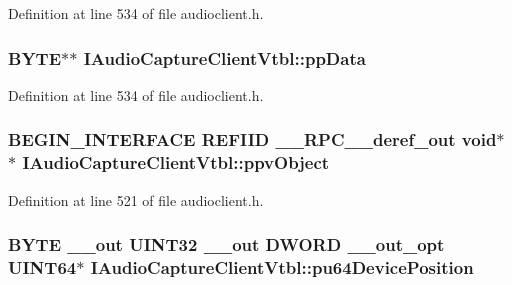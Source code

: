 Definition at line 534 of file audioclient.\+h.

\subsubsection[{\texorpdfstring{pp\+Data}{ppData}}]{ {\bf B\+Y\+TE}$\ast$$\ast$ I\+Audio\+Capture\+Client\+Vtbl\+::pp\+Data}\hypertarget{struct_i_audio_capture_client_vtbl_a98282ba19bf589f5d2b00595a2006ecc}{}\label{struct_i_audio_capture_client_vtbl_a98282ba19bf589f5d2b00595a2006ecc}


Definition at line 534 of file audioclient.\+h.

\subsubsection[{\texorpdfstring{ppv\+Object}{ppvObject}}]{\setlength{\rightskip}{0pt plus 5cm}B\+E\+G\+I\+N\+\_\+\+I\+N\+T\+E\+R\+F\+A\+CE {\bf R\+E\+F\+I\+ID} {\bf \+\_\+\+\_\+\+R\+P\+C\+\_\+\+\_\+deref\+\_\+out} {\bf void}$\ast$$\ast$ I\+Audio\+Capture\+Client\+Vtbl\+::ppv\+Object}\hypertarget{struct_i_audio_capture_client_vtbl_a12a06742a0ff338d0bdc554755ff9724}{}\label{struct_i_audio_capture_client_vtbl_a12a06742a0ff338d0bdc554755ff9724}


Definition at line 521 of file audioclient.\+h.

\subsubsection[{\texorpdfstring{pu64\+Device\+Position}{pu64DevicePosition}}]{ {\bf B\+Y\+TE} {\bf \+\_\+\+\_\+out} U\+I\+N\+T32 {\bf \+\_\+\+\_\+out} {\bf D\+W\+O\+RD} {\bf \+\_\+\+\_\+out\+\_\+opt} U\+I\+N\+T64$\ast$ I\+Audio\+Capture\+Client\+Vtbl\+::pu64\+Device\+Position}\hypertarget{struct_i_audio_capture_client_vtbl_adce2c24dcf7a47a805b673fb3fbeb19e}{}\label{struct_i_audio_capture_client_vtbl_adce2c24dcf7a47a805b673fb3fbeb19e}



